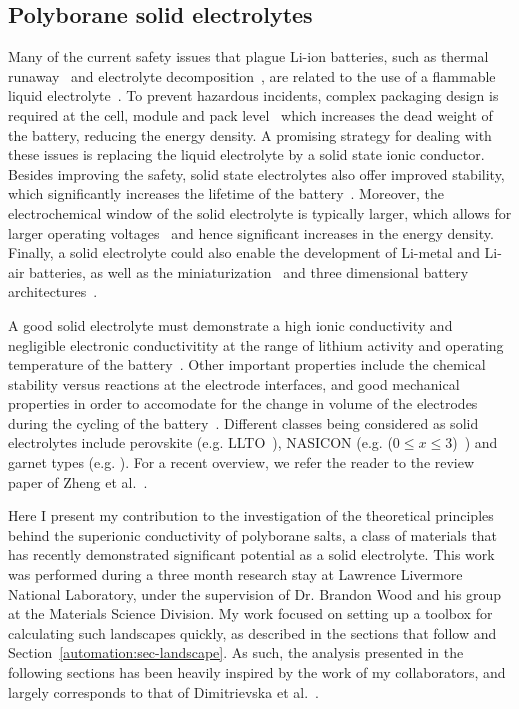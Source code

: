\begin{refsection}
\section{Polyborane solid electrolytes} \label{batteries:sec-solid_electrolyte}

Many of the current safety issues that plague Li-ion batteries, such as thermal runaway~\cite{Wang2012} and electrolyte decomposition~\cite{Lisbona2011}, are related to the use of a flammable liquid electrolyte~\cite{Liu2018, Ouyang2019}. To prevent hazardous incidents, complex packaging design is required at the cell, module and pack level~\cite{Dougthy2012} which increases the dead weight of the battery, reducing the energy density. A promising strategy for dealing with these issues is replacing the liquid electrolyte by a solid state ionic conductor. Besides improving the safety, solid state electrolytes also offer improved stability, which significantly increases the lifetime of the battery~\cite{Mauger2019}. Moreover, the electrochemical window of the solid electrolyte is typically larger, which allows for larger operating voltages~\cite{Li2014} and hence significant increases in the energy density. Finally, a solid electrolyte could also enable the development of Li-metal and Li-air batteries, as well as the miniaturization~\cite{Bates2000, Um2017} and three dimensional battery architectures~\cite{Long2004, Pearse2018}. 

A good solid electrolyte must demonstrate a high ionic conductivity and negligible electronic conductivitity at the range of lithium activity and operating temperature of the battery~\cite{Knauth2009}. Other important properties include the chemical stability versus reactions at the electrode interfaces, and good mechanical properties in order to accomodate for the change in volume of the electrodes during the cycling of the battery~\cite{Koerver2018}. Different classes being considered as solid electrolytes include perovskite (e.g. LLTO~\cite{Inaguma1993}), NASICON (e.g.  ($0 \leq x \leq 3$)~\cite{Hagman1968}) and garnet types (e.g.  \cite{Murugan2007}). For a recent overview, we refer the reader to the review paper of Zheng et al.~\cite{Zheng2018}.

Here I present my contribution to the investigation of the theoretical principles behind the superionic conductivity of polyborane salts, a class of materials that has recently demonstrated significant potential as a solid electrolyte. This work was performed during a three month research stay at Lawrence Livermore National Laboratory, under the supervision of Dr. Brandon Wood and his group at the Materials Science Division. My work focused on setting up a toolbox for calculating such landscapes quickly, as described in the sections that follow and Section~\ref{automation:sec-landscape}. As such, the analysis presented in the following sections has been heavily inspired by the work of my collaborators, and largely corresponds to that of Dimitrievska et al.~\cite{Dimitrievska2018}. 


\end{refsection}
